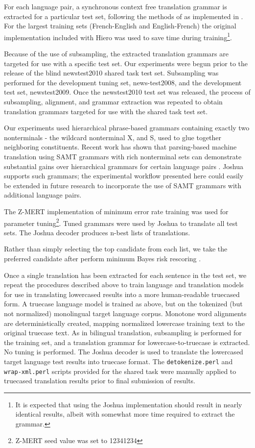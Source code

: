 \documentclass[11pt, a4paper]{article}
\begin{document}
For each language pair, a synchronous context free translation grammar is extracted for a particular test set, following the methods of  as implemented in \cite{Schwartz-PBML}. For the largest training sets (French-English and English-French) the original \cite{Lopez2008} implementation included with Hiero was used to save time during training\footnote{It is expected that using the Joshua implementation should result in nearly identical results, albeit with somewhat more time required to extract the grammar.}.

Because of the use of subsampling, the extracted translation grammars are targeted for use with a specific test set. Our experiments were begun prior to the release of the blind newstest2010 shared task test set. Subsampling was performed for the development tuning set, news-test2008, and the development test set, newstest2009. Once the newstest2010 test set was released, the process of subsampling, alignment, and grammar extraction was repeated to obtain translation grammars targeted for use with the shared task test set. 

Our experiments used hierarchical phrase-based grammars containing exactly two nonterminals - the wildcard nonterminal X, and S, used to glue together neighboring constituents. Recent work has shown that parsing-based machine translation using SAMT \cite{samt2006} grammars with rich nonterminal sets can demonstrate substantial gains over hierarchical grammars for certain language pairs \cite{SCALE-report}. Joshua supports such grammars; the experimental workflow presented here could easily be extended in future research to incorporate the use of SAMT grammars with additional language pairs. 

The Z-MERT implementation \cite{Zaidan2009} of minimum error rate training \cite{Och2003c} was used for parameter tuning\footnote{Z-MERT seed value was set to 12341234}. Tuned grammars were used by Joshua to translate all test sets. The Joshua decoder produces n-best lists of translations. 

Rather than simply selecting the top candidate from each list, we take the preferred candidate after perform minimum Bayes risk rescoring \cite{Kumar2004b}.

Once a single translation has been extracted for each sentence in the test set, we repeat the procedures described above to train language and translation models for use in translating lowercased results into a more human-readable truecased form. A truecase language model is trained as above, but on the tokenized (but not normalized) monolingual target language corpus. Monotone word alignments are deterministically created, mapping normalized lowercase training text to the original truecase text. As in bilingual translation, subsampling is performed for the training set, and a translation grammar for lowercase-to-truecase is extracted. No tuning is performed. The Joshua decoder is used to translate the lowercased target language test results into truecase format. The {\tt detokenize.perl} and {\tt wrap-xml.perl} scripts provided for the shared task were manually applied to truecased translation results prior to final submission of results.
\end{document}
